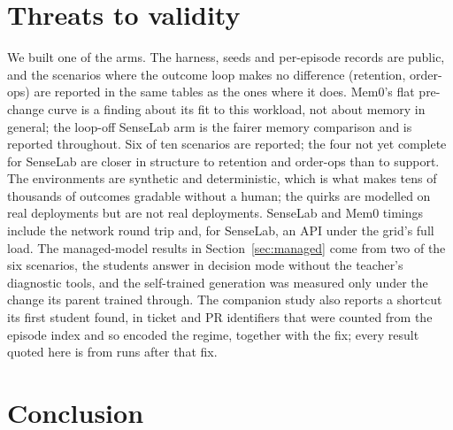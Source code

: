 \documentclass[11pt]{article}
\begin{document}
\section{Threats to validity}

We built one of the arms. The harness, seeds and per-episode records are public, and the
scenarios where the outcome loop makes no difference (retention, order-ops) are reported in the
same tables as the ones where it does. Mem0's flat pre-change curve is a finding about its fit to this workload,
not about memory in general; the loop-off SenseLab arm is the fairer memory comparison and is
reported throughout. Six of ten scenarios are reported; the four not yet complete for SenseLab
are closer in structure to retention and order-ops than to support. The environments are
synthetic and deterministic, which is what makes tens of thousands of outcomes gradable
without a human; the quirks are modelled on real deployments but are not real deployments.
SenseLab and Mem0 timings include the network round trip and, for SenseLab, an API under the
grid's full load. The managed-model results in Section~\ref{sec:managed} come from two of the
six scenarios, the students answer in decision mode without the teacher's diagnostic tools,
and the self-trained generation was measured only under the change its parent trained
through. The companion study also reports a shortcut its first student found, in ticket and
PR identifiers that were counted from the episode index and so encoded the regime, together
with the fix; every result quoted here is from runs after that fix.

\section{Conclusion}
\end{document}
